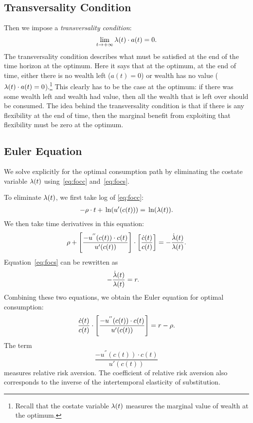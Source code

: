 \documentclass[letterpaper,12pt,leqno]{article}
\begin{document}
\subsection{Transversality Condition} 

Then we impose a \textit{transversality condition}:
\begin{equation}
\lim_{t\to+\infty} \lambda(t)\cdot a(t)=0.\label{eq:trans1}
\end{equation}
The transversality condition describes what must be satisfied at the end of the time horizon at the optimum. Here it says that at the optimum, at the end of time, either there is no wealth left ($a(t)=0$) or wealth has no value ($\lambda(t)\cdot a(t)=0$).\footnote{Recall that the costate variable $\lambda(t)$ measures the marginal value of wealth at the optimum.} This clearly has to be the case at the optimum: if there was some wealth left and wealth had value, then all the wealth that is left over should be consumed. The idea behind the transversality condition is that if there is any flexibility at the end of time, then the marginal benefit from exploiting that flexibility must be zero at the optimum.

\subsection{Euler Equation} 

We solve explicitly for the optimal consumption path by eliminating the costate variable $\lambda(t)$ using~\eqref{eq:focc} and~\eqref{eq:focs}. 

To eliminate $\lambda(t)$, we first take log of \eqref{eq:focc}:
\begin{align*}
-\r \cdot t+ \ln{u'(c(t))} =\ln{\l(t)}.
\end{align*}
We then take time derivatives in this equation:
\begin{equation*}
\rho+\left[  \frac{-u^{''}(c(t)) \cdot c(t)}{u'(c(t))} \right]\cdot \left[ \frac{\dot{c}(t)}{c(t)} \right] =-\frac{\dot{\lambda}(t)}{\lambda(t)}.
\end{equation*}
Equation~\eqref{eq:focs} can be rewritten as
\begin{align*}
-\frac{\dot{\lambda}(t)}{\lambda(t)}&=  r.
\end{align*}
Combining these two equations, we obtain the Euler equation for optimal consumption:
\begin{equation}
\frac{\dot{c}(t)}{c(t)}\cdot \left[ \frac{-u^{''}(c(t)) \cdot c(t)}{u'(c(t)) } \right] =r-\rho.
\label{eq:EULER}\end{equation}
The term \[\frac{-u^{''}(c(t))\cdot  c(t)}{u'(c(t))}\] measures relative risk aversion. The coefficient of relative risk aversion also corresponds to the inverse of the intertemporal elasticity of substitution.
\end{document}
